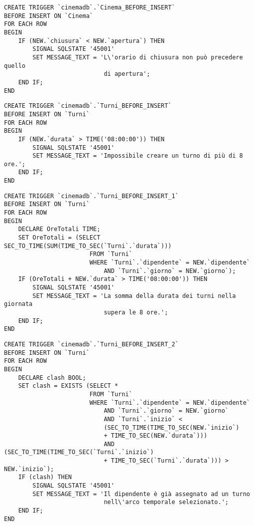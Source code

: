 \begin{verbatim}
CREATE TRIGGER `cinemadb`.`Cinema_BEFORE_INSERT`
BEFORE INSERT ON `Cinema`
FOR EACH ROW
BEGIN
    IF (NEW.`chiusura` < NEW.`apertura`) THEN
        SIGNAL SQLSTATE '45001'
        SET MESSAGE_TEXT = 'L\'orario di chiusura non può precedere quello
                            di apertura';
    END IF;
END
\end{verbatim}

\begin{verbatim}
CREATE TRIGGER `cinemadb`.`Turni_BEFORE_INSERT`
BEFORE INSERT ON `Turni`
FOR EACH ROW
BEGIN
    IF (NEW.`durata` > TIME('08:00:00')) THEN
        SIGNAL SQLSTATE '45001'
        SET MESSAGE_TEXT = 'Impossibile creare un turno di più di 8 ore.';
    END IF;
END
\end{verbatim}

\begin{verbatim}
CREATE TRIGGER `cinemadb`.`Turni_BEFORE_INSERT_1` 
BEFORE INSERT ON `Turni` 
FOR EACH ROW
BEGIN
    DECLARE OreTotali TIME;
    SET OreTotali = (SELECT SEC_TO_TIME(SUM(TIME_TO_SEC(`Turni`.`durata`)))
                        FROM `Turni`
                        WHERE `Turni`.`dipendente` = NEW.`dipendente`
                            AND `Turni`.`giorno` = NEW.`giorno`);
    IF (OreTotali + NEW.`durata` > TIME('08:00:00')) THEN
        SIGNAL SQLSTATE '45001'
        SET MESSAGE_TEXT = 'La somma della durata dei turni nella giornata
                            supera le 8 ore.';
    END IF;
END
\end{verbatim}

\pagebreak
\begin{verbatim}
CREATE TRIGGER `cinemadb`.`Turni_BEFORE_INSERT_2`
BEFORE INSERT ON `Turni`
FOR EACH ROW
BEGIN
    DECLARE clash BOOL;
    SET clash = EXISTS (SELECT * 
                        FROM `Turni` 
                        WHERE `Turni`.`dipendente` = NEW.`dipendente`
                            AND `Turni`.`giorno` = NEW.`giorno`
                            AND `Turni`.`inizio` < 
                            (SEC_TO_TIME(TIME_TO_SEC(NEW.`inizio`) 
                            + TIME_TO_SEC(NEW.`durata`))) 
                            AND (SEC_TO_TIME(TIME_TO_SEC(`Turni`.`inizio`) 
                            + TIME_TO_SEC(`Turni`.`durata`))) > NEW.`inizio`);
    IF (clash) THEN
        SIGNAL SQLSTATE '45001'
        SET MESSAGE_TEXT = 'Il dipendente è già assegnato ad un turno
                            nell\'arco temporale selezionato.';
    END IF;
END
\end{verbatim}

